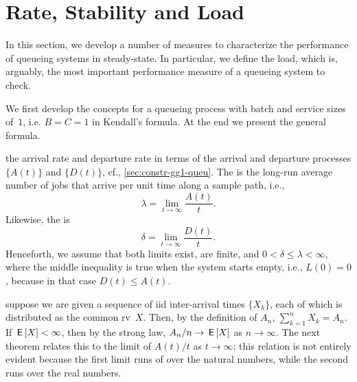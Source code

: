 \documentclass[stochastic-or.tex]{subfiles}
\begin{document}
\section{Rate, Stability and Load}
\label{sec:rate-stability}



In this section, we develop a number of measures to characterize the performance of queueing systems in steady-state.
In particular, we define the load, which is, arguably, the most important performance measure of a queueing system to check.

We first develop the concepts for a queueing process with batch and service sizes of~$1$, i.e. $B=C=1$ in Kendall's formula. At the end we present the general formula.


 the arrival rate and departure rate in terms of the arrival and departure processes $\{A(t)\}$ and $\{D(t)\}$, cf., \cref{sec:constr-gg1-queu}.
The  is the long-run average number of jobs that arrive per unit time along a sample path, i.e.,
\begin{equation*}
 \lambda = \lim_{t\to\infty} \frac{A(t)}t.
\end{equation*}
Likewise, the  is
\begin{equation}\label{eq:28}
 \delta = \lim_{t\to\infty} \frac{D(t)}t.
\end{equation}
Henceforth, we assume that both limits exist, are finite, and $0<\delta \leq \lambda<\infty$, where the middle inequality is true when the system starts empty, i.e., $L(0) = 0$, because in that case $D(t) \leq A(t)$.


 suppose we are given a sequence of iid inter-arrival times $\{X_k\}$, each of which is distributed as the common rv~$X$.
Then, by the definition of $A_{n}$, $\sum_{k=1}^n X_k = A_n$.
If $\,\mathsf{E}\left[X\right] < \infty$, then by the strong law, $A_n/n \to \,\mathsf{E}\left[X\right]$ as $n\to \infty$.
The next theorem relates this to the limit of $A(t)/t$ as $t\to \infty$; this relation is not entirely evident because the first limit runs of over the natural numbers, while the second runs over the real numbers.
\end{document}
